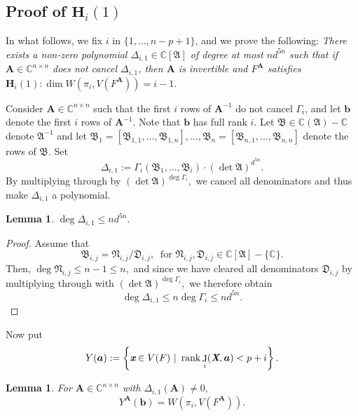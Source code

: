\documentclass[a4paper]{article}
\def\fB{{\mathfrak B}}
\def\fN{{\mathfrak N}}
\def\fD{{\mathfrak D}}
\def\A{\mathfrak{A}}
\def\Xb{\textit{\textbf{X}}}
\def\mA{{\bm A}}
\def\xb{\textit{\textbf{x}}}
\def\D{\Delta}
\DeclareMathOperator{\J}{J}
\DeclareMathOperator{\rk}{rank}
\def\C{\mathbb{C}}
\def\gi{\Gamma_i}
\newtheorem{lemma}[theorem]{Lemma}
\begin{document}
    \subsection{Proof of $\textbf{H}_i(1)$} 
     In what follows, we fix $i$ in $\{1,\dots,n-p+1\}$, and
    we prove the following: {\em There exists a non-zero polynomial
    $\D_{i,1} \in \C[\A]$ of degree at most $nd^{5n}$ such that if $\mA
    \in \C^{n\times n}$ does not cancel $\D_{i,1}$, then $\mA$ is
    invertible and $F^\mA$ satisfies $\textbf{H}_i(1): \dim W(\pi_i,V(F^{\mA}))=i-1$.}
    
    Consider $\bm A \in \C^{n \times n}$ such that the first $i$ rows of $\bm A^{-1}$ do not cancel $\gi$, and let $\bm b$ denote the first $i$ rows of $\bm A^{-1}$. Note that $\bm b$ has full rank $i$. Let $\fB \in \C(\A)-\C$ denote $\A^{-1}$ and let $\fB_1=[\fB_{1,1},\hdots,\fB_{1,n}],\hdots,\fB_n=[\fB_{n,1},\hdots,\fB_{n,n}]$ denote the rows of $\fB.$ Set  
    \[
    \Delta_{i,1} := \Gamma_i(\fB_1,\hdots,\fB_i)\cdot (\det \A)^{d^{5n}}. 
    \]
    By multiplying through by $(\det \A)^{\deg \gi},$ we cancel all denominators and thus make $\D_{i,1}$ a polynomial. 
    \begin{lemma}
    $\deg \Delta_{i,1} \leq nd^{5n}.$
    \end{lemma}
    \begin{proof}
        Assume that 
        \[
        \fB_{i,j}=\fN_{i,j}/\fD_{i,j},~ \textrm{ for } \fN_{i,j},\fD_{i,j} \in \C[\A]-\{\C\}.
        \]
        Then, $\deg \fN_{i,j} \leq n-1 \leq n,$ and since we have cleared all denominators $\fD_{i,j}$ by multiplying through with $(\det \A)^{\deg \gi},$ we therefore obtain 
        \[
        \deg \Delta_{i,1} \leq n\deg \gi \leq nd^{5n}.
        \]
    \end{proof}
    \noindent
    Now put 
    \[
    Y(\bm a) := \left\{\xb \in V(F)~|~\rk \J_i(\Xb,\bm a) < p+i\right\}.
    \]
    \begin{lemma}
    For $\mA \in \C^{n \times n}$ with $\Delta_{i,1}(\mA) \not = 0,$ 
    \[
    Y^{\mA}(\bm b) = W\left(\pi_i,V\left(F^{\mA}\right)\right).
    \]
    \end{lemma}
\end{document}
